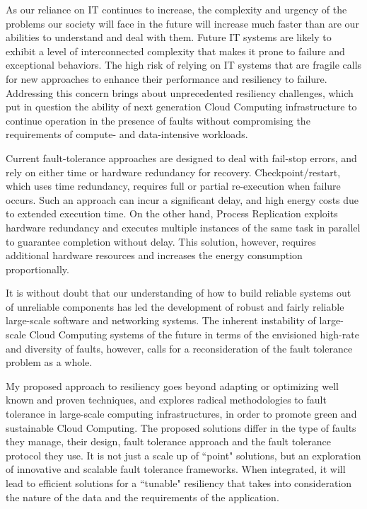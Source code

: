 As our reliance on IT continues to increase, the complexity and urgency of the problems our society will face in the future will increase much faster than are our abilities to understand and deal with them. Future IT systems are likely to exhibit a level of interconnected complexity that makes it prone to failure and exceptional behaviors. The high risk of relying on IT systems that are fragile calls for new approaches to enhance their performance and resiliency to failure. Addressing this concern brings about unprecedented resiliency challenges, which put in question the ability of next generation Cloud Computing infrastructure to continue operation in the presence of faults without compromising the requirements of compute- and data-intensive workloads. 

Current fault-tolerance approaches are designed to deal with fail-stop errors, and rely on either time or hardware redundancy for recovery. Checkpoint/restart, which
uses time redundancy, requires full or partial re-execution when failure occurs. 
Such an approach
can incur a significant delay, %
and high energy costs due to extended execution time.
On the other hand, Process Replication exploits hardware redundancy and executes multiple
instances of the same task in parallel to guarantee completion without delay.  %
This solution,
however, requires additional hardware resources and increases the energy consumption proportionally. 

It is without doubt that our understanding of how to build reliable systems out of unreliable components has led the development of robust and fairly reliable large-scale software and networking systems. The inherent instability of large-scale Cloud Computing systems of the future in terms of the envisioned high-rate and diversity of faults, however, calls for a reconsideration of the fault tolerance problem as a whole. %

My proposed approach to resiliency goes beyond adapting or optimizing well known and proven techniques, and explores radical methodologies to fault tolerance in large-scale computing infrastructures, in order to promote green and sustainable Cloud Computing. The proposed solutions differ in the type of faults they manage, their design, fault tolerance approach and the fault tolerance protocol they use. It is not just a scale up of  ``point" solutions, but an exploration of innovative and scalable fault tolerance frameworks. When integrated, it will lead to efficient solutions for a ``tunable" resiliency that takes into consideration the nature of the data and the requirements of the application.


